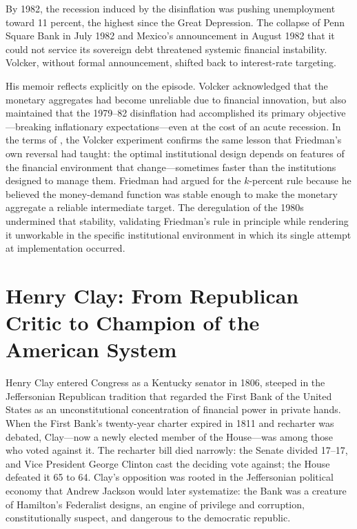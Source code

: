 \documentclass[12pt]{article}
\begin{document}
By 1982, the recession induced by the disinflation was pushing
unemployment toward 11 percent, the highest since the Great Depression.
The collapse of Penn Square Bank in July 1982 and Mexico's announcement
in August 1982 that it could not service its sovereign debt threatened
systemic financial instability.  Volcker, without formal announcement,
shifted back to interest-rate targeting.

His memoir \citep{VolckerHarper2018} reflects explicitly on the episode.
Volcker acknowledged that the monetary aggregates had become unreliable
due to financial innovation, but also maintained that the 1979--82
disinflation had accomplished its primary objective---breaking
inflationary expectations---even at the cost of an acute recession.
In the terms of \citet{Sargent2011}, the Volcker experiment confirms
the same lesson that Friedman's own reversal had taught: the optimal
institutional design depends on features of the financial environment
that change---sometimes faster than the institutions designed to manage
them.  Friedman had argued for the $k$-percent rule because he believed
the money-demand function was stable enough to make the monetary
aggregate a reliable intermediate target.  The deregulation of the 1980s
undermined that stability, validating Friedman's rule in principle while
rendering it unworkable in the specific institutional environment in
which its single attempt at implementation occurred.


\section{Henry Clay: From Republican Critic to Champion of the American
         System}

Henry Clay entered Congress as a Kentucky senator in 1806, steeped in
the Jeffersonian Republican tradition that regarded the First Bank of
the United States as an unconstitutional concentration of financial power
in private hands.  When the First Bank's twenty-year charter expired in
1811 and recharter was debated, Clay---now a newly elected member of the
House---was among those who voted against it.  The recharter bill died
narrowly: the Senate divided 17--17, and Vice President George Clinton
cast the deciding vote against; the House defeated it 65 to 64.  Clay's
opposition was rooted in the Jeffersonian political economy that Andrew
Jackson would later systematize: the Bank was a creature of Hamilton's
Federalist designs, an engine of privilege and corruption, constitutionally
suspect, and dangerous to the democratic republic.
\end{document}
